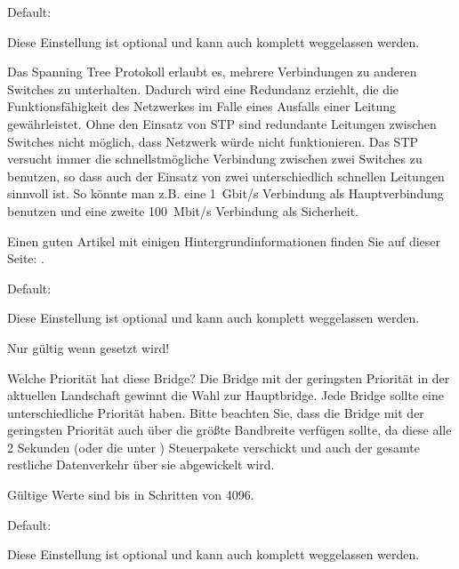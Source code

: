 \begin{description}

  Default: 

  Diese Einstellung ist optional und kann auch komplett weggelassen
  werden.

  Das Spanning Tree Protokoll erlaubt es, mehrere Verbindungen zu
  anderen Switches zu unterhalten. Dadurch wird eine Redundanz
  erziehlt, die die Funktionsfähigkeit des Netzwerkes im Falle eines
  Ausfalls einer Leitung gewährleistet. Ohne den Einsatz von STP sind
  redundante Leitungen zwischen Switches nicht möglich, dass Netzwerk
  würde nicht funktionieren. Das STP versucht immer die
  schnellstmögliche Verbindung zwischen zwei Switches zu benutzen, so
  dass auch der Einsatz von zwei unterschiedlich schnellen Leitungen
  sinnvoll ist. So könnte man z.B. eine 1~Gbit/s Verbindung als
  Hauptverbindung benutzen und eine zweite 100~Mbit/s Verbindung als
  Sicherheit.

  Einen guten Artikel mit einigen Hintergrundinformationen finden Sie
  auf dieser Seite:
  .


  Default: 

  Diese Einstellung ist optional und kann auch komplett weggelassen
  werden.

  Nur gültig wenn  gesetzt wird!

  Welche Priorität hat diese Bridge? Die Bridge mit der geringsten
  Priorität in der aktuellen Landschaft gewinnt die Wahl zur
  Hauptbridge. Jede Bridge sollte eine unterschiedliche Priorität
  haben. Bitte beachten Sie, dass die Bridge mit der geringsten
  Priorität auch über die größte Bandbreite verfügen sollte, da diese
  alle 2 Sekunden (oder die unter )
  Steuerpakete verschickt und auch der gesamte restliche Datenverkehr
  über sie abgewickelt wird.

  Gültige Werte sind  bis  in Schritten von 4096.


  Default: 

  Diese Einstellung ist optional und kann auch komplett weggelassen
  werden.


\end{description}

